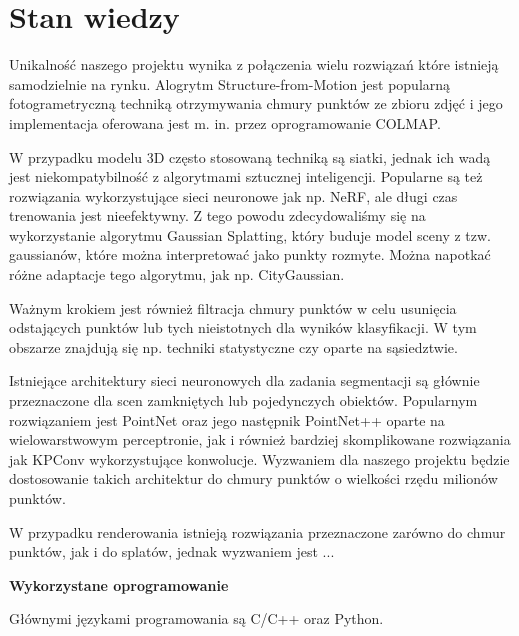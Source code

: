 \section{Stan wiedzy}

Unikalność naszego projektu wynika z połączenia wielu rozwiązań które istnieją samodzielnie na rynku. Alogrytm Structure-from-Motion jest popularną fotogrametryczną techniką otrzymywania chmury punktów ze zbioru zdjęć i jego implementacja oferowana jest m. in. przez oprogramowanie COLMAP. 

W przypadku modelu 3D często stosowaną techniką są siatki, jednak ich wadą jest niekompatybilność z algorytmami sztucznej inteligencji. Popularne są też rozwiązania wykorzystujące sieci neuronowe jak np. NeRF, ale długi czas trenowania jest nieefektywny. Z tego powodu zdecydowaliśmy się na wykorzystanie algorytmu Gaussian Splatting, który buduje model sceny z tzw. gaussianów, które można interpretować jako punkty rozmyte. Można napotkać różne adaptacje tego algorytmu, jak np. CityGaussian.

Ważnym krokiem jest również filtracja chmury punktów w celu usunięcia odstających punktów lub tych nieistotnych dla wyników klasyfikacji. W tym obszarze znajdują się np. techniki statystyczne czy oparte na sąsiedztwie. 

Istniejące architektury sieci neuronowych dla zadania segmentacji są głównie przeznaczone dla scen zamkniętych lub pojedynczych obiektów. Popularnym rozwiązaniem jest PointNet oraz jego następnik PointNet++ oparte na wielowarstwowym perceptronie, jak i również bardziej skomplikowane rozwiązania jak KPConv wykorzystujące konwolucje. Wyzwaniem dla naszego projektu będzie dostosowanie takich architektur do chmury punktów o wielkości rzędu milionów punktów.  

W przypadku renderowania istnieją rozwiązania przeznaczone zarówno do chmur punktów, jak i do splatów, jednak wyzwaniem jest ...

\textbf{Wykorzystane oprogramowanie}

Głównymi językami programowania są C/C++ oraz Python. 